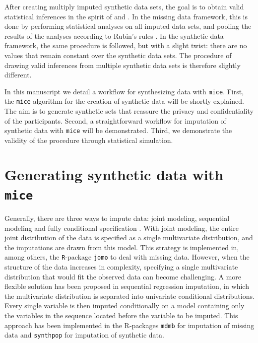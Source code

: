 \documentclass[psych,article,submit,moreauthors,pdftex]{mdpi}
\begin{document}
After creating multiply imputed synthetic data sets, the goal is to
obtain valid statistical inferences in the spirit of
\citet{rubin_multiple_1987} and \citet{neyman1934}. In the missing data
framework, this is done by performing statistical analyses on all
imputed data sets, and pooling the results of the analyses according to
Rubin's rules \citep[p.~76]{rubin_multiple_1987}. In the synthetic data
framework, the same procedure is followed, but with a slight twist:
there are no values that remain constant over the synthetic data sets.
The procedure of drawing valid inferences from multiple synthetic data
sets is therefore slightly different.

In this manuscript we detail a workflow for synthesizing data with
\texttt{mice}. First, the \texttt{mice} algorithm for the creation of
synthetic data will be shortly explained. The aim is to generate
synthetic sets that reassure the privacy and confidentiality of the
participants. Second, a straightforward workflow for imputation of
synthetic data with \texttt{mice} will be demonstrated. Third, we
demonstrate the validity of the procedure through statistical
simulation.

\hypertarget{generating-synthetic-data-with-mice}{%
\section{\texorpdfstring{Generating synthetic data with
\texttt{mice}}{Generating synthetic data with mice}}\label{generating-synthetic-data-with-mice}}

Generally, there are three ways to impute data: joint modeling,
sequential modeling and fully conditional specification
\citep{murray_multiple_2018, ludtke2020regression, grund2021using}. With
joint modeling, the entire joint distribution of the data is specified
as a single multivariate distribution, and the imputations are drawn
from this model. This strategy is implemented in, among others, the
\texttt{R}-package \texttt{jomo} \citep{jomo} to deal with missing data.
However, when the structure of the data increases in complexity,
specifying a single multivariate distribution that would fit the
observed data can become challenging. A more flexible solution has been
proposed in sequential regression imputation, in which the multivariate
distribution is separated into univariate conditional distributions.
Every single variable is then imputed conditionally on a model
containing only the variables in the sequence located before the
variable to be imputed. This approach has been implemented in the
R-packages \texttt{mdmb} \citep{mdmb} for imputation of missing data and
\texttt{synthpop} \citep{synthpop} for imputation of synthetic data.
\end{document}
